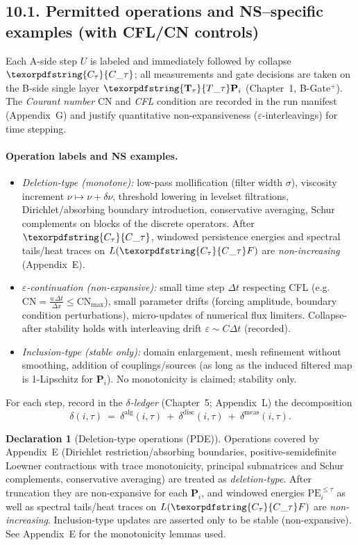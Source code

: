 \documentclass[11pt]{article}
\numberwithin{equation}{section}
\theoremstyle{plain}
\theoremstyle{definition}
\theoremstyle{remark}
\DeclareRobustCommand{\hyp}{\nobreakdash-}
\theoremstyle{plain}
\theoremstyle{definition}
\numberwithin{equation}{section}
\theoremstyle{definition}
\newtheorem{declaration}[theorem]{Declaration}
\DeclareRobustCommand{\Ttau}{\texorpdfstring{\ensuremath{\mathbf{T}_{\tau}}}{T\_\tau}}
\DeclareRobustCommand{\Ctau}{\texorpdfstring{\ensuremath{C_{\tau}}}{C\_\tau}}
\numberwithin{equation}{section}
\theoremstyle{plain}
\theoremstyle{definition}
\theoremstyle{remark}
\providecommand{\Cfun}[1]{\mathsf{C}_{#1}}
\providecommand{\Tfun}[1]{\mathbf{T}_{#1}}
\providecommand{\Ctau}{\Cfun{\tau}}
\providecommand{\Ttau}{\Tfun{\tau}}
\begin{document}
\subsection*{10.1. Permitted operations and NS--specific examples (with CFL/CN controls)}
Each A\hyp side step \(U\) is labeled and immediately followed by collapse \(\Ctau\); all measurements and gate decisions are taken on the B\hyp side single layer \(\Ttau\mathbf{P}_i\) (Chapter~1, B\hyp Gate\(^{+}\)). The \emph{Courant number} \(\mathrm{CN}\) and \emph{CFL} condition are recorded in the run manifest (Appendix~G) and justify quantitative non\hyp expansiveness (\(\varepsilon\)\hyp interleavings) for time stepping.

\paragraph{Operation labels and NS examples.}
\begin{itemize}
  \item \emph{Deletion\hyp type (monotone):} low\hyp pass mollification (filter width \(\sigma\)), viscosity increment \(\nu\mapsto \nu+\delta\nu\), threshold lowering in levelset filtrations, Dirichlet/absorbing boundary introduction, conservative averaging, Schur complements on blocks of the discrete operators. After \(\Ctau\), windowed persistence energies and spectral tails/heat traces on \(L(\Ctau F)\) are \emph{non\hyp increasing} (Appendix~E).
  \item \emph{\(\varepsilon\)\hyp continuation (non\hyp expansive):} small time step \(\Delta t\) respecting CFL (e.g.\ \(\mathrm{CN}=\frac{u\,\Delta t}{\Delta x}\le \mathrm{CN}_{\max}\)), small parameter drifts (forcing amplitude, boundary condition perturbations), micro\hyp updates of numerical flux limiters. Collapse\hyp after stability holds with interleaving drift \(\varepsilon\!\sim\!C\Delta t\) (recorded).
  \item \emph{Inclusion\hyp type (stable only):} domain enlargement, mesh refinement without smoothing, addition of couplings/sources (as long as the induced filtered map is 1\hyp Lipschitz for \(\mathbf{P}_i\)). No monotonicity is claimed; stability only.
\end{itemize}
For each step, record in the \emph{\(\delta\)\hyp ledger} (Chapter~5; Appendix~L) the decomposition
\[
\delta(i,\tau)\ =\ \delta^{\mathrm{alg}}(i,\tau)\ +\ \delta^{\mathrm{disc}}(i,\tau)\ +\ \delta^{\mathrm{meas}}(i,\tau).
\]

\begin{declaration}[Deletion\hyp type operations (PDE)]\label{spec:10-pde-del}
Operations covered by Appendix~E (Dirichlet restriction/absorbing boundaries, positive\hyp semidefinite Loewner contractions with trace monotonicity, principal submatrices and Schur complements, conservative averaging) are treated as \emph{deletion\hyp type}.
After truncation they are non\hyp expansive for each \(\mathbf{P}_i\), and windowed energies \(\mathrm{PE}_i^{\le\tau}\) as well as spectral tails/heat traces on \(L(\Ctau F)\) are \emph{non\hyp increasing}.
Inclusion\hyp type updates are asserted only to be stable (non\hyp expansive). See Appendix~E for the monotonicity lemmas used.
\end{declaration}
\end{document}
